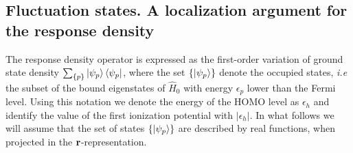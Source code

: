 \documentclass[reprint,aps,prb]{revtex4-1}
\renewcommand{\r}{{\bf r}}
\newcommand{\eps}{\epsilon}
\newcommand{\op}[1]{\hat {#1}}
\newcommand{\hnot}{\op{H}_0}
\begin{document}




\subsection{Fluctuation states. A localization argument for the response density}
\label{FluctuationState}

The response density operator is expressed as the first-order variation of ground state density $\sum_{\{p\}} \ket{\psi_p} \bra{\psi_p}$, where the set $\{\ket{\psi_p}\}$ denote the 
occupied states, \emph{i.e} the subset of the bound eigenstates of $\hnot$ with energy $\eps_p$ lower than the Fermi level. Using this notation we denote the energy of the HOMO level 
as $\eps_h$ and identify the value of the first ionization potential with $|\eps_h|$. In what follows we will assume that the set of states $\{\ket{\psi_p}\}$ are described by real 
functions, when projected in the $\r$-representation.  
\end{document}
